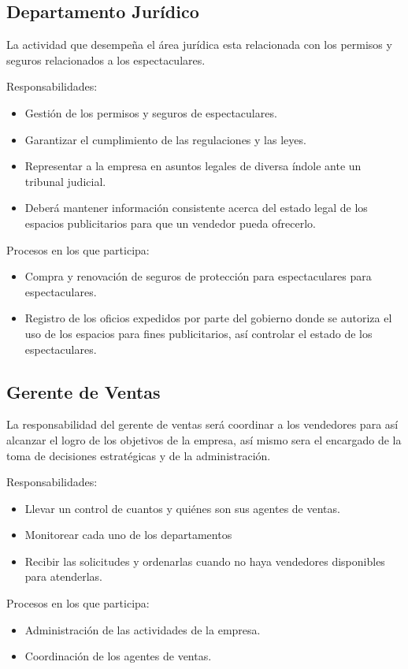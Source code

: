 \begin{Usuario}{\subsection{Departamento Jurídico}}{
La actividad que desempeña el área jurídica esta relacionada con los permisos y seguros relacionados a los espectaculares.
}
\item[Responsabilidades:]\cdtEmpty
\begin{itemize}
    \item Gestión de los permisos y seguros de espectaculares.
    \item Garantizar el cumplimiento de las regulaciones y las leyes.
    \item Representar a la empresa en asuntos legales de diversa índole ante un tribunal judicial.
    \item Deberá mantener información consistente acerca del estado legal de los espacios publicitarios para que un vendedor pueda ofrecerlo.
    
\end{itemize}
\item[Procesos en los que participa:]\cdtEmpty
\begin{itemize}
    \item Compra y renovación de seguros de protección para espectaculares para espectaculares.
    \item Registro de los oficios expedidos por parte del gobierno donde se autoriza el uso de los espacios para fines publicitarios, así controlar el estado de los espectaculares.
\end{itemize}
\end{Usuario}

\begin{Usuario}{\subsection{Gerente de Ventas}}{
La responsabilidad del gerente de ventas será coordinar a los vendedores para así alcanzar el logro de los objetivos de la empresa, así mismo sera el encargado de la toma de decisiones estratégicas y de la  administración.
}
   \item[Responsabilidades:]\cdtEmpty
\begin{itemize}
    \item Llevar un control de cuantos y quiénes son sus agentes de ventas.
     \item Monitorear cada uno de los departamentos 
     \item Recibir las solicitudes y ordenarlas cuando no haya vendedores disponibles para atenderlas. 
     \end{itemize}
 \item[Procesos en los que participa:]\cdtEmpty
\begin{itemize}
    \item Administración de las actividades de la empresa.
    \item Coordinación de los agentes de ventas.
\end{itemize}
\end{Usuario}
